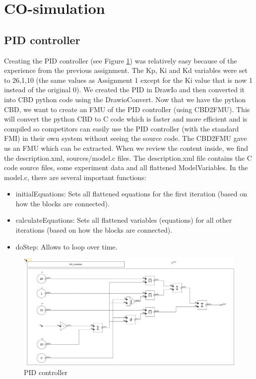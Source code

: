 \documentclass{article}
\begin{document}
\section{CO-simulation}
\subsection{PID controller}
Creating the PID controller (see Figure \ref{fig:PID-controller}) was relatively easy because of the experience from the previous assignment. The Kp, Ki and Kd variables were set to 26,1,10 (the same values as Assignment 1 except for the Ki value that is now 1 instead of the original 0). We created the PID in DrawIo and then converted it into CBD python code using the DrawioConvert. Now that we have the python CBD, we want to create an FMU of the PID controller (using CBD2FMU). This will convert the python CBD to C code which is faster and more efficient and is compiled so competitors can easily use the PID controller (with the standard FMI) in their own system without seeing the source code. 
The CBD2FMU gave us an FMU which can be extracted. When we review the content inside, we find the description.xml, sources/model.c files. The description.xml file contains the C code source files, some experiment data and all flattened ModelVariables. In the model.c, there are several important functions:
\begin{itemize}
  \item initialEquations: Sets all flattened equations for the first iteration (based on how the blocks are connected).
  \item calculateEquations: Sets all flattened variables (equations) for all other iterations (based on how the blocks are connected).
  \item doStep: Allows to loop over time.
\end{itemize}
\begin{figure}
    \centering
    \includegraphics[width=0.75\linewidth]{Images/PID_controller.drawio.png}
    \caption{PID controller}
    \label{fig:PID-controller}
\end{figure}
\end{document}

